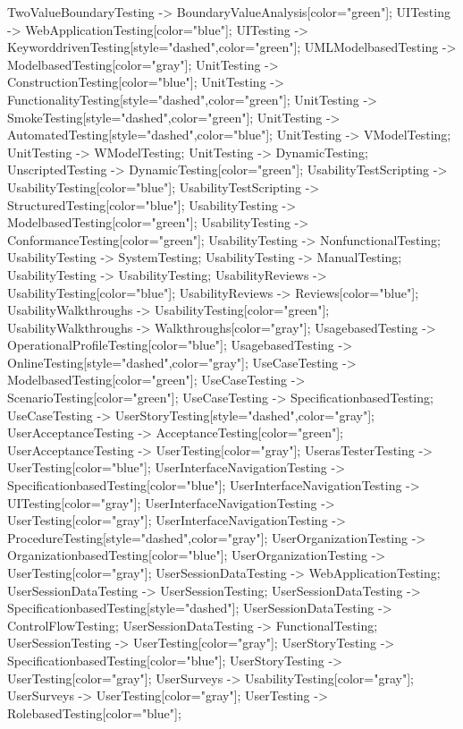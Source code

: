 \documentclass{article}
\begin{document}
{TwoValueBoundaryTesting -> BoundaryValueAnalysis[color="green"];
UITesting -> WebApplicationTesting[color="blue"];
UITesting -> KeyworddrivenTesting[style="dashed",color="green"];
UMLModelbasedTesting -> ModelbasedTesting[color="gray"];
UnitTesting -> ConstructionTesting[color="blue"];
UnitTesting -> FunctionalityTesting[style="dashed",color="green"];
UnitTesting -> SmokeTesting[style="dashed",color="green"];
UnitTesting -> AutomatedTesting[style="dashed",color="blue"];
UnitTesting -> VModelTesting;
UnitTesting -> WModelTesting;
UnitTesting -> DynamicTesting;
UnscriptedTesting -> DynamicTesting[color="green"];
UsabilityTestScripting -> UsabilityTesting[color="blue"];
UsabilityTestScripting -> StructuredTesting[color="blue"];
UsabilityTesting -> ModelbasedTesting[color="green"];
UsabilityTesting -> ConformanceTesting[color="green"];
UsabilityTesting -> NonfunctionalTesting;
UsabilityTesting -> SystemTesting;
UsabilityTesting -> ManualTesting;
UsabilityTesting -> UsabilityTesting;
UsabilityReviews -> UsabilityTesting[color="blue"];
UsabilityReviews -> Reviews[color="blue"];
UsabilityWalkthroughs -> UsabilityTesting[color="green"];
UsabilityWalkthroughs -> Walkthroughs[color="gray"];
UsagebasedTesting -> OperationalProfileTesting[color="blue"];
UsagebasedTesting -> OnlineTesting[style="dashed",color="gray"];
UseCaseTesting -> ModelbasedTesting[color="green"];
UseCaseTesting -> ScenarioTesting[color="green"];
UseCaseTesting -> SpecificationbasedTesting;
UseCaseTesting -> UserStoryTesting[style="dashed",color="gray"];
UserAcceptanceTesting -> AcceptanceTesting[color="green"];
UserAcceptanceTesting -> UserTesting[color="gray"];
UserasTesterTesting -> UserTesting[color="blue"];
UserInterfaceNavigationTesting -> SpecificationbasedTesting[color="blue"];
UserInterfaceNavigationTesting -> UITesting[color="gray"];
UserInterfaceNavigationTesting -> UserTesting[color="gray"];
UserInterfaceNavigationTesting -> ProcedureTesting[style="dashed",color="gray"];
UserOrganizationTesting -> OrganizationbasedTesting[color="blue"];
UserOrganizationTesting -> UserTesting[color="gray"];
UserSessionDataTesting -> WebApplicationTesting;
UserSessionDataTesting -> UserSessionTesting;
UserSessionDataTesting -> SpecificationbasedTesting[style="dashed"];
UserSessionDataTesting -> ControlFlowTesting;
UserSessionDataTesting -> FunctionalTesting;
UserSessionTesting -> UserTesting[color="gray"];
UserStoryTesting -> SpecificationbasedTesting[color="blue"];
UserStoryTesting -> UserTesting[color="gray"];
UserSurveys -> UsabilityTesting[color="gray"];
UserSurveys -> UserTesting[color="gray"];
UserTesting -> RolebasedTesting[color="blue"];
}
\end{document}
